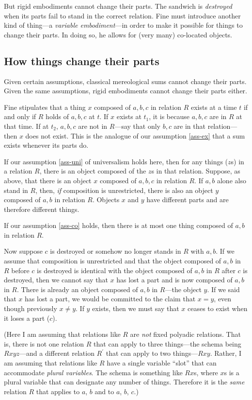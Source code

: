 \documentclass[11pt]{article}
\begin{document}
\begin{spacing}{1.5}
But rigid embodiments cannot change their parts.  The sandwich is {\em
  destroyed} when its parts fail to stand in the correct relation.
Fine must introduce another kind of thing---a {\em variable
  embodiment}---in order to make it possible for things to change
their parts.  In doing so, he allows for (very many) co-located
objects.

\subsection{How things change their parts}
\label{h-part}
Given certain assumptions, classical mereological sums cannot change
their parts.  Given the same assumptions, rigid embodiments cannot
change their parts either.

Fine stipulates that a thing $x$ composed of $a, b, c$ in relation $R$
exists at a time $t$ if and only if $R$ holds of $a, b, c$ at $t$.  If
$x$ exists at $t_1$, it is because $a, b, c$ are in $R$ at that time.
If at $t_2$, $a, b, c$ are not in $R$---say that only $b, c$ are in
that relation---then $x$ does not exist.  This is the analogue of our
assumption \ref{ass-ex} that a sum exists whenever its parts do.

If our assumption \ref{ass-uni} of universalism holds here, then for
any things ($z$s) in a relation $R$, there is an object composed of
the $z$s in that relation.  Suppose, as above, that there is an object
$x$ composed of $a, b, c$ in relation $R$.  If $a, b$ alone also stand
in $R$, then, {\em if} composition is unrestricted, there is also an
object $y$ composed of $a, b$ in relation $R$.  Objects $x$ and $y$
have different parts and are therefore different things.

If our assumption \ref{ass-co} holds, then there is at most one thing
composed of $a, b$ in relation $R$.

Now suppose $c$ is destroyed or somehow no longer stands in $R$ with
$a, b$.  If we assume that composition is unrestricted and that the
object composed of $a, b$ in $R$ before $c$ is destroyed is identical
with the object composed of $a, b$ in $R$ after $c$ is destroyed, then
we cannot say that $x$ has lost a part and is now composed of $a, b$
in $R$.  There is already an object composed of $a, b$ in $R$---the
object $y$.  If we said that $x$ has lost a part, we would be
committed to the claim that $x = y$, even though previously $x \neq
y$.  If $y$ exists, then we must say that $x$ ceases to exist when it
loses a part ($c$).

(Here I am assuming that relations like $R$ are {\em not} fixed
polyadic relations.  That is, there is not one relation $R$ that can
apply to three things---the schema being $Rxyz$---and a different
relation $R^{\prime}$ that can apply to two things---$Rxy$.  Rather, I
am assuming that relations like $R$ have a single variable ``slot''
that can accommodate {\em plural variables}.  The schema is something
like $Rx$s, where $x$s is a plural variable that can designate any
number of things.  Therefore it is the {\em same} relation $R$ that
applies to $a$, $b$ and to $a$, $b$, $c$.)


\end{spacing}
\end{document}
